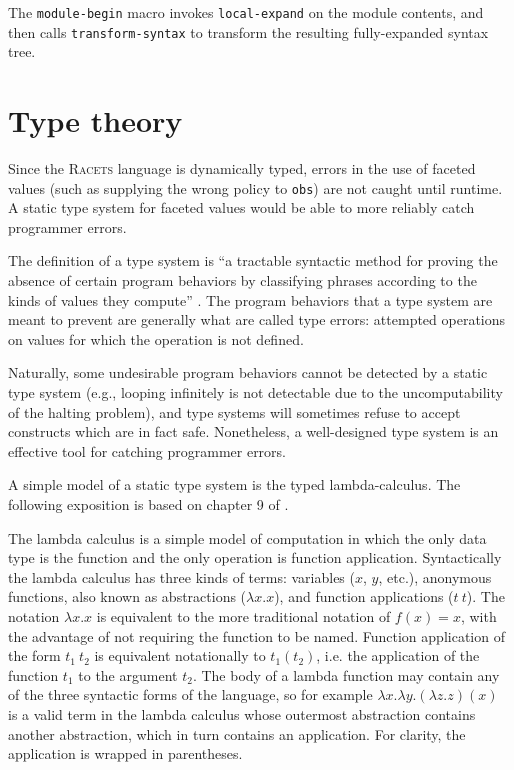 \documentclass{article}
\begin{document}
The \texttt{module-begin} macro invokes \texttt{local-expand} on the module contents, and then calls \texttt{transform-syntax} to transform the resulting fully-expanded syntax tree.



\section{Type theory}
Since the \textsc{Racets} language is dynamically typed, errors in the use of faceted values (such as supplying the wrong policy to \texttt{obs}) are not caught until runtime. A static type system for faceted values would be able to more reliably catch programmer errors.

The definition of a type system is ``a tractable syntactic method for proving the absence of certain program behaviors by classifying phrases according to the kinds of values they compute'' \cite{types}. The program behaviors that a type system are meant to prevent are generally what are called type errors: attempted operations on values for which the operation is not defined.

Naturally, some undesirable program behaviors cannot be detected by a static type system (e.g., looping infinitely is not detectable due to the uncomputability of the halting problem), and type systems will sometimes refuse to accept constructs which are in fact safe. Nonetheless, a well-designed type system is an effective tool for catching programmer errors.

A simple model of a static type system is the typed lambda-calculus. The following exposition is based on chapter 9 of \cite{types}.

The lambda calculus is a simple model of computation in which the only data type is the function and the only operation is function application. Syntactically the lambda calculus has three kinds of terms: variables ($x$, $y$, etc.), anonymous functions, also known as abstractions ($\lambda x . x$), and function applications ($t\ t$). The notation $\lambda x . x$ is equivalent to the more traditional notation of $f(x) = x$, with the advantage of not requiring the function to be named. Function application of the form $t_1\ t_2$ is equivalent notationally to $t_1(t_2)$, i.e. the application of the function $t_1$ to the argument $t_2$. The body of a lambda function may contain any of the three syntactic forms of the language, so for example $\lambda x . \lambda y . (\lambda z . z)(x)$ is a valid term in the lambda calculus whose outermost abstraction contains another abstraction, which in turn contains an application. For clarity, the application is wrapped in parentheses.
\end{document}

